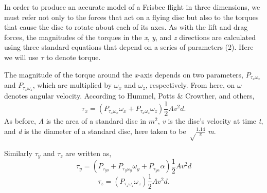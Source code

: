 \documentclass[a4paper,12pt, oneside]{article}
\newcommand{\red}[1]{\textcolor{red}{#1}}
\begin{document}
In order to produce an accurate model of a Frisbee flight in three dimensions, we must refer not only to the forces that act on a flying disc but also to the torques that cause the disc to rotate about each of its axes. As with the lift and drag forces, the magnitudes of the torques in the \textit{x}, \textit{y}, and \textit{z} directions are calculated using three standard equations that depend on a series of parameters (2). Here we will use $\tau$ to denote torque.

The magnitude of the torque around the \textit{x}-axis depends on two parameters, $P_{\tau_x\omega_x}$ and $P_{\tau_x\omega_z}$, which are multiplied by $\omega_x$ and $\omega_z$, respectively. From here, on $\omega$ denotes angular velocity. According to Hummel, Potts \& Crowther, and others,
\begin{equation}
  \tau_x=(P_{\tau_x\omega_x}\omega_x+P_{\tau_x\omega_z}\omega_z)\frac{1}2Av^2d.
\end{equation}
As before, \textit{A} is the area of a standard disc in $\textit{m}^2$, \textit{v} is the disc's velocity at time \textit{t}, and \textit{d} is the diameter of a standard disc, here taken to be $\sqrt\frac{1.14}\pi$ \textit{m}.

Similarly $\tau_y$ and $\tau_z$ are written as,
\begin{equation}
  \tau_y=(P_{\tau_{y0}}+P_{\tau_y\omega_y}\omega_y+P_{\tau_{y\alpha}}\alpha)\frac{1}2Av^2d
\end{equation}
\begin{equation}
  \tau_z=(P_{\tau_z\omega_z}\omega_z)\frac{1}2Av^2d.
\end{equation}
\end{document}
